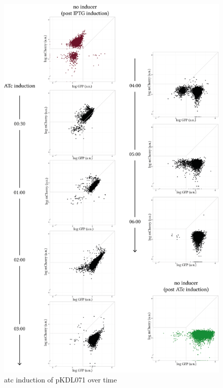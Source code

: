 \begin{figure}[tb]
	\begin{center}
\includegraphics[scale=0.7]{../../chapters/chapterABCFlow/images/pKDL071_atc_time.png}
\caption[LoF caption]{\label{fig:switch_timecourse_atc} \acrshort{atc} induction of pKDL071 over time}
\end{center}
\end{figure}


